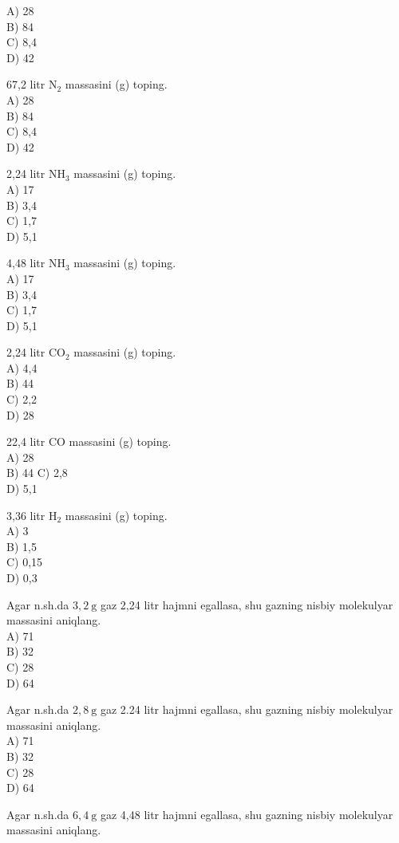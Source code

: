 A) 28\\
B) 84\\
C) 8,4\\
D) 42
  \item 67,2 litr $\mathrm{N}_{2}$ massasini (g) toping.\\
A) 28\\
B) 84\\
C) 8,4\\
D) 42
  \item 2,24 litr $\mathrm{NH}_{3}$ massasini (g) toping.\\
A) 17\\
B) 3,4\\
C) 1,7\\
D) 5,1
  \item 4,48 litr $\mathrm{NH}_{3}$ massasini (g) toping.\\
A) 17\\
B) 3,4\\
C) 1,7\\
D) 5,1
  \item 2,24 litr $\mathrm{CO}_{2}$ massasini (g) toping.\\
A) 4,4\\
B) 44\\
C) 2,2\\
D) 28
  \item 22,4 litr CO massasini (g) toping.\\
A) 28\\
B) 44 C) 2,8\\
D) 5,1
  \item 3,36 litr $\mathrm{H}_{2}$ massasini (g) toping.\\
A) 3\\
B) 1,5\\
C) 0,15\\
D) 0,3
  \item Agar n.sh.da $3,2 \mathrm{~g}$ gaz 2,24 litr hajmni egallasa, shu gazning nisbiy molekulyar massasini aniqlang.\\
A) 71\\
B) 32\\
C) 28\\
D) 64
  \item Agar n.sh.da $2,8 \mathrm{~g}$ gaz 2.24 litr hajmni egallasa, shu gazning nisbiy molekulyar massasini aniqlang.\\
A) 71\\
B) 32\\
C) 28\\
D) 64
  \item Agar n.sh.da $6,4 \mathrm{~g}$ gaz 4,48 litr hajmni egallasa, shu gazning nisbiy molekulyar massasini aniqlang.\\
